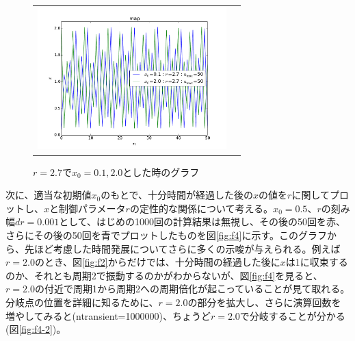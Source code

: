 \documentclass{jsarticle}
\begin{document}
\begin{enumerate}
\begin{enumerate}
\begin{figure}[H]
\begin{center}
\begin{tabular}{cc}
					\\
					
					\begin{minipage}{0.46\hsize}
						\begin{center}
							\includegraphics[width=7.3cm]{figure_1-3.pdf}
							\caption{$r=2.7$で$x_{0}=0.1, 2.0$とした時のグラフ}
							\label{fig:f3}
						\end{center}
					\end{minipage}
					
				\end{tabular}
				\end{center}
				\end{figure}
				
				次に、適当な初期値$x_{0}$のもとで、十分時間が経過した後の$x$の値を$r$に関してプロットし、$x$と制御パラメータ$r$の定性的な関係について考える。$x_{0}=0.5$、$r$の刻み幅$dr=0.001$として、はじめの1000回の計算結果は無視し、その後の50回を赤、さらにその後の50回を青でプロットしたものを図\ref{fig:f4}に示す。このグラフから、先ほど考慮した時間発展についてさらに多くの示唆が与えられる。例えば$r=2.0$のとき、図\ref{fig:f2}からだけでは、十分時間の経過した後に$x$は1に収束するのか、それとも周期2で振動するのかがわからないが、図\ref{fig:f4}を見ると、$r=2.0$の付近で周期1から周期2への周期倍化が起こっていることが見て取れる。分岐点の位置を詳細に知るために、$r=2.0$の部分を拡大し、さらに演算回数を増やしてみると(ntransient=1000000)、ちょうど$r=2.0$で分岐することが分かる(図\ref{fig:f4-2})。
				

\end{enumerate}
\end{enumerate}
\end{document}
